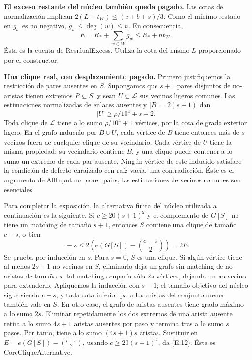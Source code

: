 \documentclass[spanish,11pt,a4paper]{article}
\begin{document}
\textbf{El exceso restante del núcleo también queda pagado.} Las cotas de normalización implican \(2(L+t_W)\le(c+b+s)/3\). Como el mínimo restado en \(g_w\) es no negativo, \(g_w\le\deg(w)\le n\). En consecuencia, \[
E=R_*+\sum_{w\in W}g_w\le R_*+nt_W.
\tag{E.11}
\] Ésta es la cuenta de {\ttfamily\small ResidualExce\discretionary{\hbox{\ensuremath{\hookrightarrow}}}{}{}ss}. Utiliza la cota del mismo \(L\) proporcionado por el constructor.

\textbf{Una clique real, con desplazamiento pagado.} Primero justifiquemos la restricción de pares ausentes en \(S\). Supongamos que \(s+1\) pares disjuntos de no-aristas tienen extremos \(B\subseteq S\), y sean \(U\subseteq\mathcal L\) sus vecinos ligeros comunes. Las estimaciones normalizadas de enlaces ausentes y \(|B|=2(s+1)\) dan \[
|U|\ge\rho/10^4+s+2.
\] Toda clique de \(\mathcal L\) tiene a lo sumo \(\rho/10^4+1\) vértices, por la cota de grado exterior ligero. En el grafo inducido por \(B\cup U\), cada vértice de \(B\) tiene entonces más de \(s\) vecinos fuera de cualquier clique de su vecindario. Cada vértice de \(U\) tiene la misma propiedad: su vecindario contiene \(B\), y una clique puede contener a lo sumo un extremo de cada par ausente. Ningún vértice de este inducido satisface la condición de defecto enraizado con raíz vacía, una contradicción. Éste es el argumento de {\ttfamily\small AllInput.\discretionary{\hbox{\ensuremath{\hookrightarrow}}}{}{}no\_\discretionary{\hbox{\ensuremath{\hookrightarrow}}}{}{}core\_\discretionary{\hbox{\ensuremath{\hookrightarrow}}}{}{}pairs}; las estimaciones de vecinos comunes son esenciales.

Para completar la exposición, la alternativa finita del núcleo utilizada a continuación es la siguiente. Si \(c\ge20(s+1)^2\) y el complemento de \(G[S]\) no tiene un matching de tamaño \(s+1\), entonces \(S\) contiene una clique de tamaño \(c-s\), o bien \[
c-s\le2\left(e(G[S])-\binom{c-s}{2}\right)=2E.
\tag{E.12}
\] Se prueba por inducción en \(s\). Para \(s=0\), \(S\) es una clique. Si algún vértice tiene al menos \(2s+1\) no-vecinos en \(S\), eliminarlo deja un grafo sin matching de no-aristas de tamaño \(s\): tal matching ocuparía sólo \(2s\) vértices, dejando un no-vecino para extenderlo. Apliquemos la inducción con \(s-1\); el tamaño objetivo del núcleo sigue siendo \(c-s\), y toda cota inferior para las aristas del conjunto menor también vale en \(S\). En otro caso, el grafo de aristas ausentes tiene grado máximo a lo sumo \(2s\). Eliminar repetidamente los dos extremos de una arista ausente retira a lo sumo \(4s+1\) aristas ausentes por paso y termina tras a lo sumo \(s\) pasos. Por tanto, tiene a lo sumo \((4s+1)s\) aristas. Sustituir en \(E=e(G[S])-\binom{c-s}{2}\), usando \(c\ge20(s+1)^2\), da (E.12). Éste es {\ttfamily\small CoreCliqueAl\discretionary{\hbox{\ensuremath{\hookrightarrow}}}{}{}ternative}.
\end{document}
